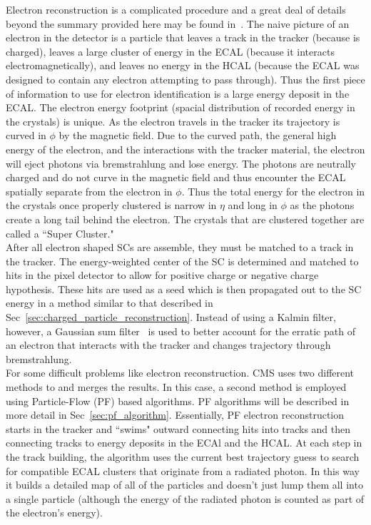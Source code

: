 	Electron reconstruction is a complicated procedure and a great deal of details beyond the summary provided here may be found in~\cite{baffiReco,egmReco,egm2013}. The naive picture of an electron in the detector is a particle that leaves a track in the tracker (because is charged), leaves a large cluster of energy in the ECAL (because it interacts electromagnetically), and leaves no energy in the HCAL (because the ECAL was designed to contain any electron attempting to pass through). Thus the first piece of information to use for electron identification is a large energy deposit in the ECAL. The electron energy footprint (spacial distribution of recorded energy in the crystals) is unique. As the electron travels in the tracker its trajectory is curved in $\phi$ by the magnetic field. Due to the curved path, the general high energy of the electron, and the interactions with the tracker material, the electron will eject photons via bremstrahlung and lose energy. The photons are neutrally charged and do not curve in the magnetic field and thus encounter the ECAL spatially separate from the electron in $\phi$. Thus the total energy for the electron in the crystals once properly clustered is narrow in $\eta$ and long in $\phi$ as the photons create a long tail behind the electron. The crystals that are clustered together are called a ``Super Cluster."\\
	
	After all electron shaped SCs are assemble, they must be matched to a track in the tracker. The energy-weighted center of the SC is determined and matched to hits in the pixel detector to allow for positive charge or negative charge hypothesis. These hits are used as a seed which is then propagated out to the SC energy in a method similar to that described in  Sec~\ref{sec:charged_particle_reconstruction}. Instead of using a Kalmin filter, however, a Gaussian sum filter~\cite{gsf} is used to better account for the erratic path of an electron that interacts with the tracker and changes trajectory through bremstrahlung.\\
	
	For some difficult problems like electron reconstruction. CMS uses two different methods to and merges the results. In this case, a second method is employed using Particle-Flow (PF) based algorithms. PF algorithms will be described in more detail in Sec~\ref{sec:pf_algorithm}. Essentially, PF electron reconstruction starts in the tracker and ``swims" outward connecting hits into tracks and then connecting tracks to energy deposits in the ECAl and the HCAL. At each step in the track building, the algorithm uses the current best trajectory guess to search for compatible ECAL clusters that originate from a radiated photon. In this way it builds a detailed map of all of the particles and doesn't just lump them all into a single particle (although the energy of the radiated photon is counted as part of the electron's energy).\\
	
